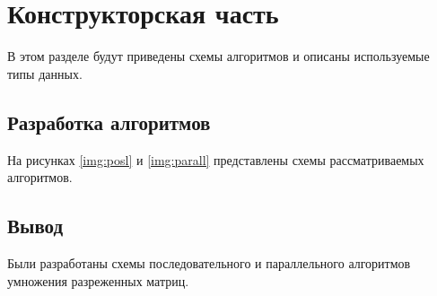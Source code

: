 \chapter{Конструкторская часть}
В этом разделе будут приведены схемы алгоритмов и описаны используемые типы данных.

\section{Разработка алгоритмов}

На рисунках \ref{img:posl} и \ref{img:parall} представлены схемы рассматриваемых алгоритмов.


\FloatBarrier


\FloatBarrier

\section*{Вывод}

Были разработаны схемы последовательного и параллельного алгоритмов умножения разреженных матриц.

